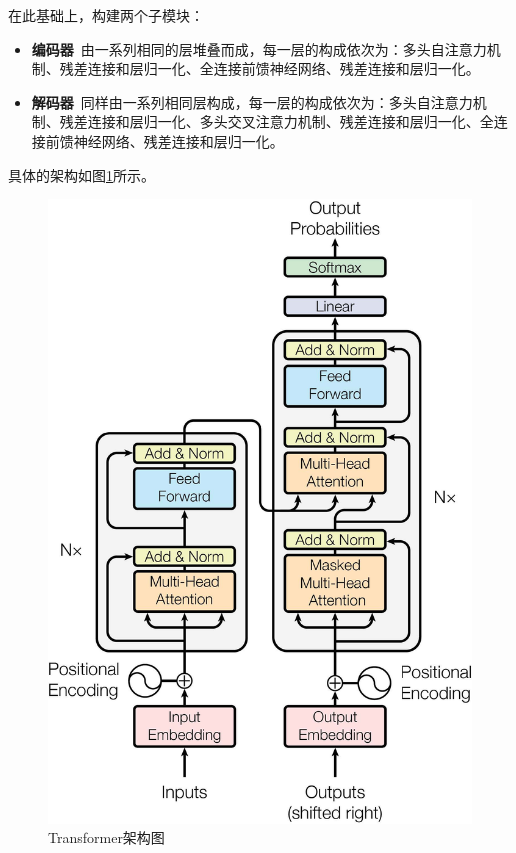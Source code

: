 在此基础上，构建两个子模块：

\begin{itemize}[itemsep=-5pt, leftmargin=4em]
    \item \textbf{编码器}\  由一系列相同的层堆叠而成，每一层的构成依次为：多头自注意力机制、残差连接和层归一化、全连接前馈神经网络、残差连接和层归一化。
    
    \item \textbf{解码器}\  同样由一系列相同层构成，每一层的构成依次为：多头自注意力机制、残差连接和层归一化、多头交叉注意力机制、残差连接和层归一化、全连接前馈神经网络、残差连接和层归一化。
\end{itemize}

具体的架构如图\ref{fig:transformer}所示。

\begin{figure}[htb]
    \centering
    \includegraphics[width=0.45\linewidth]{img/transformer.jpg}          
    \caption{Transformer架构图}
    \label{fig:transformer}
\end{figure}

